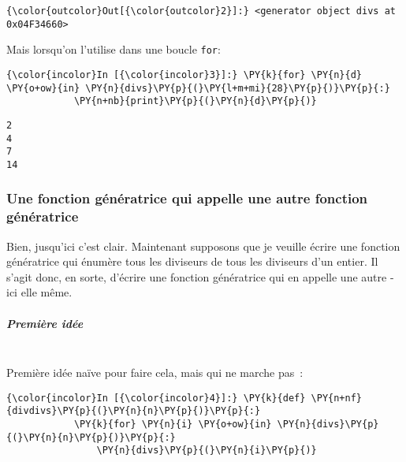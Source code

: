 \begin{Verbatim}[commandchars=\\\{\}]
{\color{outcolor}Out[{\color{outcolor}2}]:} <generator object divs at 0x04F34660>
\end{Verbatim}
            
    Mais lorsqu'on l'utilise dans une boucle \texttt{for}:

    \begin{Verbatim}[commandchars=\\\{\}]
{\color{incolor}In [{\color{incolor}3}]:} \PY{k}{for} \PY{n}{d} \PY{o+ow}{in} \PY{n}{divs}\PY{p}{(}\PY{l+m+mi}{28}\PY{p}{)}\PY{p}{:}
            \PY{n+nb}{print}\PY{p}{(}\PY{n}{d}\PY{p}{)}
\end{Verbatim}


    \begin{Verbatim}[commandchars=\\\{\}]
2
4
7
14

    \end{Verbatim}

    \hypertarget{une-fonction-guxe9nuxe9ratrice-qui-appelle-une-autre-fonction-guxe9nuxe9ratrice}{%
\subsubsection{Une fonction génératrice qui appelle une autre fonction
génératrice}\label{une-fonction-guxe9nuxe9ratrice-qui-appelle-une-autre-fonction-guxe9nuxe9ratrice}}

    Bien, jusqu'ici c'est clair. Maintenant supposons que je veuille écrire
une fonction génératrice qui énumère tous les diviseurs de tous les
diviseurs d'un entier. Il s'agit donc, en sorte, d'écrire une fonction
génératrice qui en appelle une autre - ici elle même.

    \hypertarget{premiuxe8re-iduxe9e}{%
\subparagraph{Première idée\\\\}\label{premiuxe8re-iduxe9e}}

    Première idée naïve pour faire cela, mais qui ne marche pas~:

    \begin{Verbatim}[commandchars=\\\{\}]
{\color{incolor}In [{\color{incolor}4}]:} \PY{k}{def} \PY{n+nf}{divdivs}\PY{p}{(}\PY{n}{n}\PY{p}{)}\PY{p}{:}
            \PY{k}{for} \PY{n}{i} \PY{o+ow}{in} \PY{n}{divs}\PY{p}{(}\PY{n}{n}\PY{p}{)}\PY{p}{:}
                \PY{n}{divs}\PY{p}{(}\PY{n}{i}\PY{p}{)}
\end{Verbatim}


